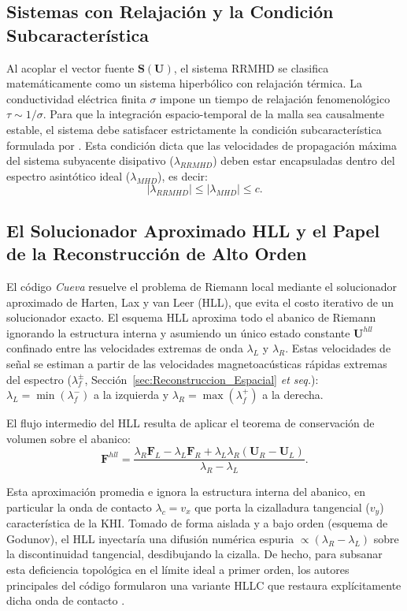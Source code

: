 \subsection{Sistemas con Relajación y la Condición Subcaracterística}

\primerparrafo Al acoplar el vector fuente $\mathbf{S}(\mathbf{U})$, el sistema RRMHD se clasifica matemáticamente como un sistema hiperbólico con relajación térmica. La conductividad eléctrica finita $\sigma$ impone un tiempo de relajación fenomenológico $\tau \sim 1/\sigma$. Para que la integración espacio-temporal de la malla sea causalmente estable, el sistema debe satisfacer estrictamente la condición subcaracterística formulada por \textcite{liu-1987}. Esta condición dicta que las velocidades de propagación máxima del sistema subyacente disipativo ($\lambda_{RRMHD}$) deben estar encapsuladas dentro del espectro asintótico ideal ($\lambda_{MHD}$), es decir:
$$
|\lambda_{RRMHD}| \le |\lambda_{MHD}| \le c.
$$

\subsection{El Solucionador Aproximado HLL y el Papel de la Reconstrucción de Alto Orden}
\label{sec:Solucionador_HLL}

\primerparrafo El código \textit{Cueva} resuelve el problema de Riemann local mediante el solucionador aproximado de Harten, Lax y van Leer (HLL), que evita el costo iterativo de un solucionador exacto. El esquema HLL aproxima todo el abanico de Riemann ignorando la estructura interna y asumiendo un único estado constante $\mathbf{U}^{hll}$ confinado entre las velocidades extremas de onda $\lambda_L$ y $\lambda_R$. Estas velocidades de señal se estiman a partir de las velocidades magnetoacústicas rápidas extremas del espectro ($\lambda_f^\pm$, Sección~\ref{sec:Reconstruccion_Espacial} \emph{et seq.}): $\lambda_L=\min(\lambda_f^-)$ a la izquierda y $\lambda_R=\max(\lambda_f^+)$ a la derecha.

El flujo intermedio del HLL resulta de aplicar el teorema de conservación de volumen sobre el abanico:
$$
\mathbf{F}^{hll} = \frac{\lambda_R \mathbf{F}_L - \lambda_L \mathbf{F}_R + \lambda_L \lambda_R (\mathbf{U}_R - \mathbf{U}_L)}{\lambda_R - \lambda_L}.
$$

Esta aproximación promedia e ignora la estructura interna del abanico, en particular la onda de contacto $\lambda_c = v_x$ que porta la cizalladura tangencial ($v_y$) característica de la KHI. Tomado de forma aislada y a bajo orden (esquema de Godunov), el HLL inyectaría una difusión numérica espuria $\propto(\lambda_R - \lambda_L)$ sobre la discontinuidad tangencial, desdibujando la cizalla. De hecho, para subsanar esta deficiencia topológica en el límite ideal a primer orden, los autores principales del código formularon una variante HLLC que restaura explícitamente dicha onda de contacto \parencite{miranda-aranguren-2018}.

